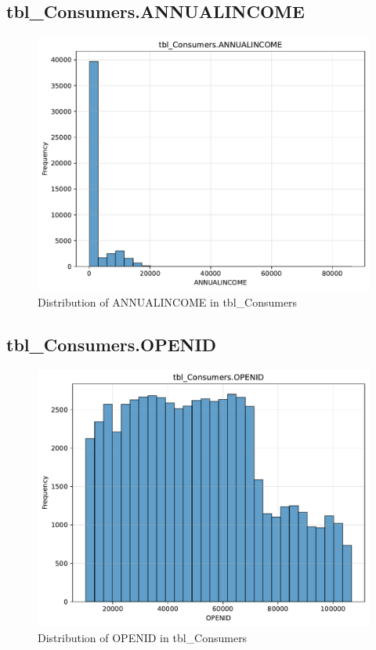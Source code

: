 \subsection{tbl\_Consumers.ANNUALINCOME}

\begin{figure}[htbp]
\centering
\includegraphics[width=\textwidth]{figures/dbo_tbl_Consumers_ANNUALINCOME.pdf}
\caption{Distribution of ANNUALINCOME in tbl\_Consumers}
\end{figure}\newpage

\subsection{tbl\_Consumers.OPENID}

\begin{figure}[htbp]
\centering
\includegraphics[width=\textwidth]{figures/dbo_tbl_Consumers_OPENID.pdf}
\caption{Distribution of OPENID in tbl\_Consumers}
\end{figure}\newpage

